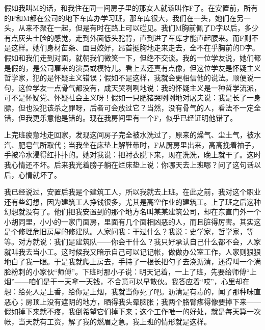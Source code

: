 假如我叫M的话，和我住在同一间房子里的那女人就该叫作F了。在安置前，所有的F和M都在公司的地下车库办学习班，那车库很大，我们在一头，她们在另一头，从来不聚在一起，但是有时在路上可以碰见。我们M胸前佩了D字以后，多少有点灰头土脸的感觉，走到外面低头驼背，直到进了车库才能直起腰来。而F则不是这样。她们身材苗条、面目姣好，昂首挺胸地走来走去，全不在乎胸前的D字。假如和我们走到对面，就朝我们微笑一下，但绝不交谈。我的一位学友说，她们都是假的，是公司雇来的演员或模特儿。看上去还真有点像，但这位学友是怀疑主义哲学家，犯的是怀疑主义错误；假如不是这样，我就会更相信他的说法。顺便说一句，这位学友一点骨气都没有，成天哭咧咧地说：我的怀疑主义是一种哲学流派，可不是怀疑党、怀疑社会主义呀！假如一只肥猪哭咧咧地对屠夫说：我是长了一身膘，但也没犯该杀之罪呀，后者可会放过它？当然，没有骨气的人，看法不一定全错，但我更乐意他是错的。现在我房间里有一个F，似乎已经证明他错了。 

上完班疲惫地走回家，发现这间房子完全被水洗过了，原来的燥气、尘土气，被水汽、肥皂气所取代；当我坐在床垫上解鞋带时，F从厨房里出来，高高挽着袖子，手被冷水浸得红扑扑的。她对我说：把衬衣脱下来，现在洗洗，晚上就干了。这时我心情还不坏。后来我光着膀子躺在烂床垫上说：你哪天去上班哪？问了这句话以后，心情就坏了。 

我已经说过，安置后我是个建筑工人，所以我就去上班。在此之前，我对这个职业还有些幻想，因为建筑工人挣钱很多，尤其是高空作业的建筑工。上了班之后这种幻想就没有了。他们把我安置到的那个地方名叫某某建筑公司，却在东直门外一个小胡同里，小小的一家门面房，里面有几个面相凶恶的人，而且脏得厉害。其实这是个修理危旧房屋的修建队。人家问我：干过什么？我说：史学家，哲学家，等等。对方就说：我们是建筑队——你会干什么？我只好承认自己什么都不会，人家就叫我去当小工。这时候我又暗示自己可以记记帐，做做办公室工作，人家则狠狠地白了我一眼。于是我就爬上房去，手持了一根长把勺子去浇沥清，还得叫一个满脸粉刺的小家伙“师傅”。下班时那小子说：明天记着，一上了班，先要给师傅“上烟”——咱们是干一天拿一天钱，不合意可以早散伙。我答应着“哎”，心里却在想：给死人是上香，给你是上烟，我就当你死了吧。沥清是有毒的，闻了那种味直恶心；房顶上没有遮阴的地方，晒得我头晕脑胀；我两个胳臂疼得像要掉下来——假如掉下来就不疼，我倒希望它们掉下来；这个工作唯一的好处，就是每天算一次帐，当天就有工资，解了我的燃眉之急。我上班的情形就是这样。 

